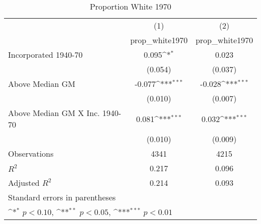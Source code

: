 \begin{table}[htbp]\centering
\def\sym#1{\ifmmode^{#1}\else\(^{#1}\)\fi}
\caption{Proportion White 1970}
\begin{tabular}{l*{2}{c}}
\hline\hline
                    &\multicolumn{1}{c}{(1)}&\multicolumn{1}{c}{(2)}\\
                    &\multicolumn{1}{c}{prop\_white1970}&\multicolumn{1}{c}{prop\_white1970}\\
\hline
Incorporated 1940-70&       0.095\sym{*}  &       0.023         \\
                    &     (0.054)         &     (0.037)         \\
[1em]
Above Median GM     &      -0.077\sym{***}&      -0.028\sym{***}\\
                    &     (0.010)         &     (0.007)         \\
[1em]
Above Median GM X Inc. 1940-70&       0.081\sym{***}&       0.032\sym{***}\\
                    &     (0.010)         &     (0.009)         \\
\hline
Observations        &        4341         &        4215         \\
\(R^{2}\)           &       0.217         &       0.096         \\
Adjusted \(R^{2}\)  &       0.214         &       0.093         \\
\hline\hline
\multicolumn{3}{l}{\footnotesize Standard errors in parentheses}\\
\multicolumn{3}{l}{\footnotesize \sym{*} \(p<0.10\), \sym{**} \(p<0.05\), \sym{***} \(p<0.01\)}\\
\end{tabular}
\end{table}
